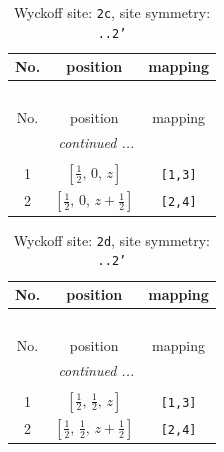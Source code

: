 \documentclass[fleqn,8pt]{jsarticle}
\begin{document}
\begin{longtable}{ccc}
\caption{Wyckoff site: {\tt 2c}, site symmetry: {\tt ..2'}}
 \\
 \hline \hline
No. & position & mapping \\ \hline \endfirsthead

\multicolumn{2}{l}{\tablename\ \thetable{}} \\
 \hline \hline
No. & position & mapping \\ \hline \endhead

 \hline \hline
\multicolumn{2}{r}{\footnotesize\it continued ...} \\ \endfoot

 \hline \hline
\multicolumn{2}{r}{} \\ \endlastfoot

1 & $\left[ \frac{1}{2},\, 0,\, z \right]$ & {\tt [1,3]} \\ \hline
2 & $\left[ \frac{1}{2},\, 0,\, z + \frac{1}{2} \right]$ & {\tt [2,4]} \\
\end{longtable}
\renewcommand{\arraystretch}{1.2}
\begin{longtable}{ccc}
\caption{Wyckoff site: {\tt 2d}, site symmetry: {\tt ..2'}}
 \\
 \hline \hline
No. & position & mapping \\ \hline \endfirsthead

\multicolumn{2}{l}{\tablename\ \thetable{}} \\
 \hline \hline
No. & position & mapping \\ \hline \endhead

 \hline \hline
\multicolumn{2}{r}{\footnotesize\it continued ...} \\ \endfoot

 \hline \hline
\multicolumn{2}{r}{} \\ \endlastfoot

1 & $\left[ \frac{1}{2},\, \frac{1}{2},\, z \right]$ & {\tt [1,3]} \\ \hline
2 & $\left[ \frac{1}{2},\, \frac{1}{2},\, z + \frac{1}{2} \right]$ & {\tt [2,4]} \\
\end{longtable}
\renewcommand{\arraystretch}{1.2}
\end{document}
